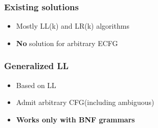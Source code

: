 \documentclass{beamer}
\begin{document}
	\begin{frame} 
		\frametitle{Existing solutions} 
		\begin{itemize}
			\item Mostly LL(k) and LR(k) algorithms
			\item \textbf{No} solution for arbitrary ECFG
		\end{itemize}

	\end{frame}
	
	\begin{frame} 
		\frametitle{Generalized LL}
		\begin{itemize}
			\item<1-> Based on LL
			\item<1-> Admit arbitrary CFG(including ambiguous)
			\item<2-> \textbf{Works only with BNF grammars}
		\end{itemize}

	\end{frame}
\end{document}
